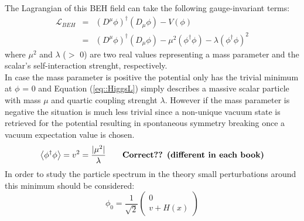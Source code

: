 The Lagrangian of this BEH field can take the following gauge-invariant terms:
\begin{eqnarray} \label{eq::HiggsL}
 \mathcal{L}_{BEH} & = & (D^{\mu} \phi)^{\dagger}(D_{\mu} \phi) - V(\phi) \nonumber \\
                   & = & (D^{\mu} \phi)^{\dagger}(D_{\mu} \phi) - \mu^{2} (\phi^{\dagger} \phi) - \lambda (\phi^{\dagger} \phi)^{2}
\end{eqnarray}
where $\mu^{2}$ and $\lambda$ ($>$ 0) are two real values representing a mass parameter and the scalar's self-interaction strenght, respectively.
\\
In case the mass parameter is positive the potential only has the trivial minimum at $\phi$ = 0 and Equation (\ref{eq::HiggsL}) simply describes a massive scalar particle with mass $\mu$ and quartic coupling strenght $\lambda$. However if the mass parameter is negative the situation is much less trivial since a non-unique vacuum state is retrieved for the potential resulting in spontaneous symmetry breaking once a vacuum expectation value is chosen.
\begin{equation}
 \left< \phi^{\dagger} \phi \right> = v^{2} = \frac{\vert \mu^{2} \vert}{\lambda} \qquad \textrm{\textbf{Correct?? (different in each book)}}
\end{equation}
In order to study the particle spectrum in the theory small perturbations around this minimum should be considered:
\begin{equation}
 \phi_{0} = \frac{1}{\sqrt{2}}\begin{pmatrix}
             0 \\
             v + H(x)
            \end{pmatrix}
\end{equation}
